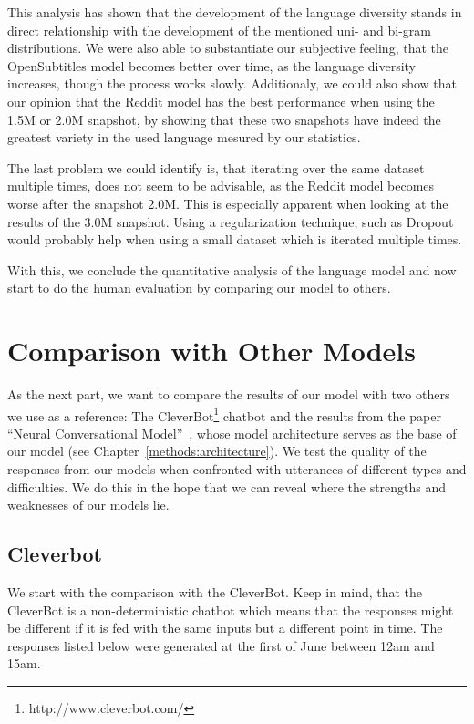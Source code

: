 This analysis has shown that the development of the language diversity stands in direct relationship with the development of the mentioned uni- and bi-gram distributions. We were also able to substantiate our subjective feeling, that the OpenSubtitles model becomes better over time, as the language diversity increases, though the process works slowly. Additionaly, we could also show that our opinion that the Reddit model has the best performance when using the 1.5M or 2.0M snapshot, by showing that these two snapshots have indeed the greatest variety in the used language mesured by our statistics.

The last problem we could identify is, that iterating over the same dataset multiple times, does not seem to be advisable, as the Reddit model becomes worse after the snapshot 2.0M. This is especially apparent when looking at the results of the 3.0M snapshot. Using a regularization technique, such as Dropout~\cite{Nitish:2014} would probably help when using a small dataset which is iterated multiple times.

With this, we conclude the quantitative analysis of the language model and now start to do the human evaluation by comparing our model to others.

\section{Comparison with Other Models}
As the next part, we want to compare the results of our model with two others we use as a reference: The CleverBot\footnote{http://www.cleverbot.com/} chatbot and the results from the paper ``Neural Conversational Model''~\cite{Vinyals:2015}, whose model architecture serves as the base of our model (see Chapter~\ref{methods:architecture}). We test the quality of the responses from our models when confronted with utterances of different types and difficulties. We do this in the hope that we can reveal where the strengths and weaknesses of our models lie.

\subsection{Cleverbot}
\label{results:comparison:cleverbot}
We start with the comparison with the CleverBot. Keep in mind, that the CleverBot is a non-deterministic chatbot which means that the responses might be different if it is fed with the same inputs but a different point in time. The responses listed below were generated at the first of June between 12am and 15am.

